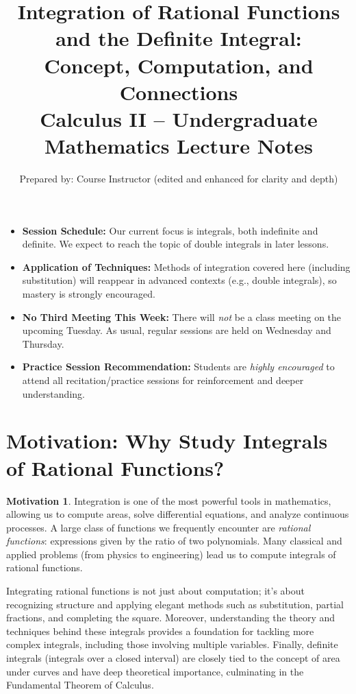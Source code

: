 \documentclass[11pt]{article}
\title{\textbf{Integration of Rational Functions and the Definite Integral:\\
Concept, Computation, and Connections}\\[0.75em]\normalsize Calculus II – Undergraduate Mathematics Lecture Notes}
\author{Prepared by: Course Instructor (edited and enhanced for clarity and depth)}
\date{}
\theoremstyle{definition}
\newtheorem*{motivation}{Motivation}
\theoremstyle{plain}
\newenvironment{announcement}{%
    \par\vspace{10pt}%
    \begin{tcolorbox}[breakable, enhanced, colframe=black, colback=gray!14, title=Course Administration, leftrule=4pt, rightrule=0pt, top=3pt, bottom=3pt, fonttitle=\normalsize\bfseries]%
}{%
    \end{tcolorbox}\vspace{4pt}%
}
\begin{document}
\maketitle

\begin{announcement}
    \begin{itemize}[leftmargin=1.5em]
        \item \textbf{Session Schedule:} Our current focus is integrals, both indefinite and definite. We expect to reach the topic of double integrals in later lessons.
        \item \textbf{Application of Techniques:} Methods of integration covered here (including substitution) will reappear in advanced contexts (e.g., double integrals), so mastery is strongly encouraged.
        \item \textbf{No Third Meeting This Week:} There will \emph{not} be a class meeting on the upcoming Tuesday. As usual, regular sessions are held on Wednesday and Thursday.
        \item \textbf{Practice Session Recommendation:} Students are \emph{highly encouraged} to attend all recitation/practice sessions for reinforcement and deeper understanding.
    \end{itemize}
\end{announcement}

\tableofcontents

\section{Motivation: Why Study Integrals of Rational Functions?}

\begin{motivation}
Integration is one of the most powerful tools in mathematics, allowing us to compute areas, solve differential equations, and analyze continuous processes. A large class of functions we frequently encounter are \emph{rational functions}: expressions given by the ratio of two polynomials. Many classical and applied problems (from physics to engineering) lead us to compute integrals of rational functions.

Integrating rational functions is not just about computation; it's about recognizing structure and applying elegant methods such as substitution, partial fractions, and completing the square. Moreover, understanding the theory and techniques behind these integrals provides a foundation for tackling more complex integrals, including those involving multiple variables. Finally, definite integrals (integrals over a closed interval) are closely tied to the concept of area under curves and have deep theoretical importance, culminating in the Fundamental Theorem of Calculus.
\end{motivation}
\end{document}
